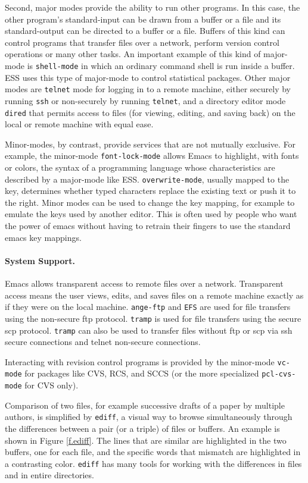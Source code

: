 \documentclass{article}
\newcommand{\stexttt}[1]{{\small\texttt{#1}}}
\newcommand{\ssf}[1]{{\small\sf{#1}}}
\begin{document}
Second, major modes provide the ability to run other programs.  In
this case, the other program's standard-input can be drawn from a
buffer or a file and its standard-output can be directed to a buffer
or a file.  Buffers of this kind can control programs that transfer
files over a network, perform version control operations or many other
tasks.  An important example of this kind of major-mode is
\stexttt{shell-mode} in which an ordinary command shell is run inside
a buffer.  ESS uses this type of major-mode to control statistical
packages.  Other major modes are \stexttt{telnet} mode for logging in
to a remote machine, either securely by running \stexttt{ssh} or
non-securely by running \stexttt{telnet}, and a directory editor mode
\stexttt{dired} that permits access to files (for viewing, editing,
and saving back) on the local or remote machine with equal ease.

Minor-modes, by contrast, provide services that are not mutually
exclusive.  For example, the minor-mode \stexttt{font-lock-mode}
allows Emacs to highlight, with fonts or colors, the syntax of a
programming language whose characteristics are described by a
major-mode like ESS.  \stexttt{overwrite-mode}, usually mapped to the
\ssf{Insert} key, determines whether typed characters replace the
existing text or push it to the right.  Minor modes can be used to
change the key mapping, for example to emulate the keys used by
another editor.  This is often used by people who want the power of
emacs without having to retrain their fingers to use the standard
emacs key mappings.


\paragraph{System Support.}
Emacs allows transparent access to remote files over a network.  
Transparent access means the user views, edits, and saves files on
a remote machine exactly as if they were on the local machine.
\stexttt{ange-ftp} and \stexttt{EFS} are used
for file transfers using the non-secure ftp protocol.
\stexttt{tramp} is used for file transfers using the secure scp protocol.
\stexttt{tramp} can also be used to transfer files without ftp or scp
via ssh secure connections and telnet non-secure connections.

Interacting with revision control programs is provided by the
minor-mode \stexttt{vc-mode} for packages like CVS, RCS, and SCCS (or
the more specialized \stexttt{pcl-cvs-mode} for CVS only).

Comparison of two files, for example successive drafts of a paper
by multiple authors, is simplified by \stexttt{ediff}, a visual 
way to browse simultaneously through
the differences between a pair (or a triple) of files or buffers.
An example is shown in Figure \ref{f.ediff}.  The lines that are similar
are highlighted in the two buffers, one for each file, and the specific
words that mismatch are highlighted in a contrasting color.
\stexttt{ediff} has many tools for working with the differences in
files and in entire directories.
\end{document}
